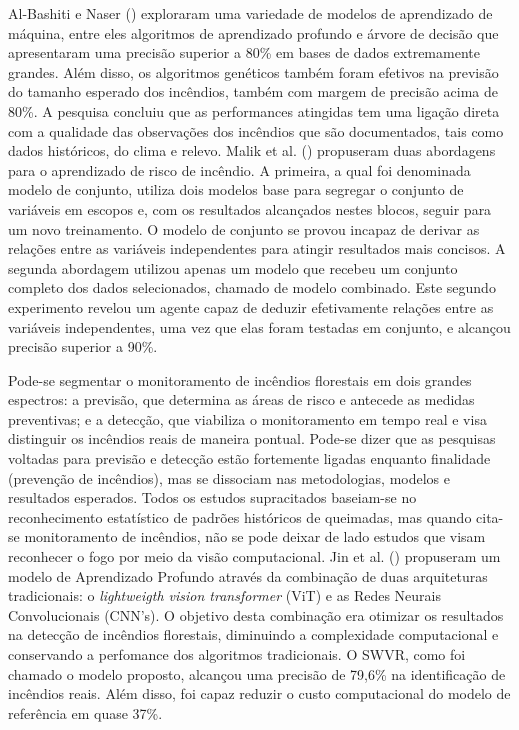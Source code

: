 \documentclass[tcc2]{uftex}
\begin{document}
Al-Bashiti e Naser (\citeyear{albashiti2022wildfire}) exploraram uma variedade de modelos de aprendizado de máquina, entre eles algoritmos de aprendizado profundo e árvore de decisão que apresentaram uma precisão superior a 80\% em bases de dados extremamente grandes. Além disso, os algoritmos genéticos também foram efetivos na previsão do tamanho esperado dos incêndios, também com margem de precisão acima de 80\%. A pesquisa concluiu que as performances atingidas tem uma ligação direta com a qualidade das observações dos incêndios que são documentados, tais como dados históricos, do clima e relevo. Malik et al. (\citeyear{malik2021datadriven}) propuseram duas abordagens para o aprendizado de risco de incêndio. A primeira, a qual foi denominada modelo de conjunto, utiliza dois modelos base para segregar o conjunto de variáveis em escopos e, com os resultados alcançados nestes blocos, seguir para um novo treinamento. O modelo de conjunto se provou incapaz de derivar as relações entre as variáveis independentes para atingir resultados mais concisos. A segunda abordagem utilizou apenas um modelo que recebeu um conjunto completo dos dados selecionados, chamado de modelo combinado. Este segundo experimento revelou um agente capaz de deduzir efetivamente relações entre as variáveis independentes, uma vez que elas foram testadas em conjunto, e alcançou precisão superior a 90\%.

Pode-se segmentar o monitoramento de incêndios florestais em dois grandes espectros: a previsão, que determina as áreas de risco e antecede as medidas preventivas; e a detecção, que viabiliza o monitoramento em tempo real e visa distinguir os incêndios reais de maneira pontual. Pode-se dizer que as pesquisas voltadas para previsão e detecção estão fortemente ligadas enquanto finalidade (prevenção de incêndios), mas se dissociam nas metodologias, modelos e resultados esperados. Todos os estudos supracitados baseiam-se no reconhecimento estatístico de padrões históricos de queimadas, mas quando cita-se monitoramento de incêndios, não se pode deixar de lado estudos que visam reconhecer o fogo por meio da visão computacional. Jin et al. (\citeyear{jin2024swvr}) propuseram um modelo de Aprendizado Profundo através da combinação de duas arquiteturas tradicionais: o \textit{lightweigth vision transformer} (ViT) e as Redes Neurais Convolucionais (CNN's). O objetivo desta combinação era otimizar os resultados na detecção de incêndios florestais, diminuindo a complexidade computacional e conservando a perfomance dos algoritmos tradicionais. O SWVR, como foi chamado o modelo proposto, alcançou uma precisão de 79,6\% na identificação de incêndios reais. Além disso, foi capaz reduzir o custo computacional do modelo de referência em quase 37\%.
\end{document}
